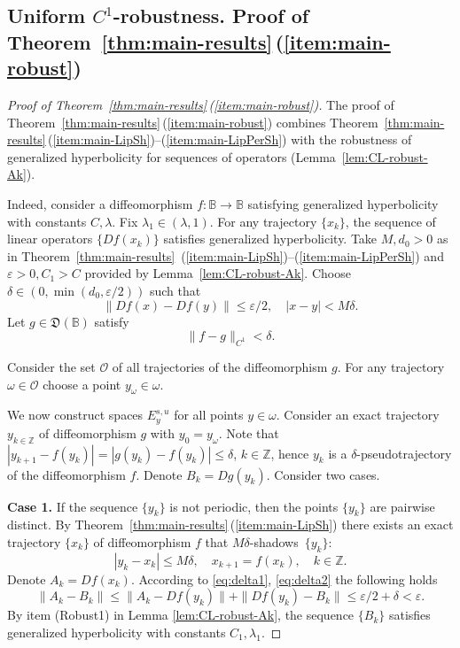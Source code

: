 \documentclass[12pt]{article}
\newcommand{\Bb}{\mathbb{B}}
\newcommand{\Zz}{\mathbb{Z}}
\newcommand{\DUC}{\mathfrak{D}}
\theoremstyle{definition}
\begin{document}
\subsection{Uniform $C^1$-robustness. Proof of Theorem~\ref{thm:main-results}\,(\ref{item:main-robust})}\label{sec:robust}

\begin{proof}[Proof of Theorem~\ref{thm:main-results}\,(\ref{item:main-robust})]
The proof of Theorem~\ref{thm:main-results}\,(\ref{item:main-robust}) combines Theorem~\ref{thm:main-results}\,(\ref{item:main-LipSh})--(\ref{item:main-LipPerSh}) with the robustness of generalized hyperbolicity for sequences of operators (Lemma~\ref{lem:CL-robust-Ak}).

Indeed, consider a diffeomorphism $f:\Bb \to \Bb$ satisfying generalized hyperbolicity with constants $C, \lambda$. Fix $\lambda_1 \in (\lambda, 1)$. 
For any trajectory $\{x_k\}$, the sequence of linear operators $\{Df(x_k)\}$ satisfies generalized hyperbolicity. Take $M, d_0 > 0$ as in Theorem~\ref{thm:main-results}\,
(\ref{item:main-LipSh})--(\ref{item:main-LipPerSh}) and $\varepsilon > 0, C_1 > C$ provided by Lemma~\ref{lem:CL-robust-Ak}. Choose $\delta \in (0, \min(d_0, \varepsilon/2))$ such that 
\begin{equation}\label{eq:delta1}
    \|Df(x)-Df(y)\| \leq \varepsilon/2, \quad |x-y| < M\delta.
\end{equation}
Let $g\in\DUC(\Bb)$ satisfy
\begin{equation}\label{eq:delta2}
\|f-g\|_{C^1}<\delta.
\end{equation}

Consider the set $\mathcal{O}$ of all trajectories of the diffeomorphism $g$. For any trajectory $\omega \in \mathcal{O}$ choose a point $y_{\omega} \in \omega$. 

We now construct spaces $E_y^{s, u}$ for all points $y \in \omega$. Consider an exact trajectory $y_{k\in \Zz}$ of diffeomorphism $g$ with $y_0 = y_{\omega}$.
Note that $|y_{k+1} - f(y_k)| = |g(y_k) - f(y_k)| \leq \delta$, $k \in \Zz$, hence $y_k$ is a $\delta$-pseudotrajectory of the diffeomorphism $f$. Denote $B_k = Dg(y_k)$. Consider two cases.

\textbf{Case 1.} If the sequence $\{y_{k}\}$ is not periodic, then the points $\{y_k\}$ are pairwise distinct. By Theorem~\ref{thm:main-results}\,(\ref{item:main-LipSh}) there exists an exact trajectory $\{x_k\}$ of diffeomorphism $f$ that $M\delta$-shadows~$\{y_k\}$:
\begin{equation}\label{eq:robustykxk}
    |y_k-x_k| \leq M\delta, \quad x_{k+1} = f(x_k), \quad k \in \Zz.    
\end{equation}
Denote $A_k = Df(x_k)$. According to \eqref{eq:delta1}, \eqref{eq:delta2} the following holds
\begin{equation}\label{eq:robustAkBk}
\|A_k - B_k\| \leq \|A_k - Df(y_k)\| + \|Df(y_k) - B_k\| \leq \varepsilon/2 + \delta < \varepsilon.
\end{equation}
By item (Robust1) in Lemma \ref{lem:CL-robust-Ak}, the sequence $\{B_k\}$ satisfies generalized hyperbolicity with constants $C_1, \lambda_1$. 


\end{proof}
\end{document}

